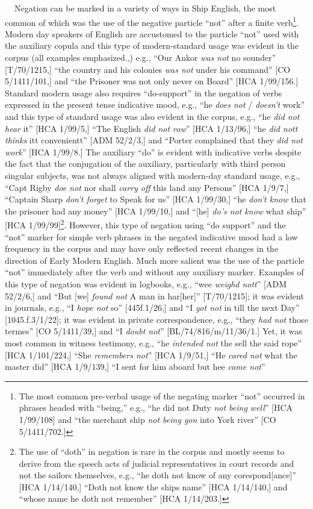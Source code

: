 \documentclass[12pt]{article}
\newenvironment{styleStandard}{\renewcommand\baselinestretch{1.0}\setlength\leftskip{0cm}\setlength\rightskip{0cm plus 1fil}\setlength\parindent{0cm}\setlength\parfillskip{0pt plus 1fil}\setlength\parskip{0in plus 1pt}\writerlistparindent\writerlistleftskip\leavevmode\normalfont\normalsize\writerlistlabel\ignorespaces}{\unskip\vspace{0in plus 1pt}\par}
\newcommand\writerlistleftskip{}
\newcommand\writerlistparindent{}
\newcommand\writerlistlabel{}
\begin{document}
\begin{styleStandard}
\textbf{\ \ }Negation can be marked in a variety of ways in Ship English, the most common of which was the use of the negative particle “not” after a finite verb\footnote{ The most common pre-verbal usage of the negating marker “not” occurred in phrases headed with “being,” e.g., “he did not Duty \textit{not being well}” [HCA 1/99/108] and “the merchant ship \textit{not being gon} into York river” [CO 5/1411/702.] }. Modern day speakers of English are accustomed to the particle “not” used with the auxiliary copula and this type of modern-standard usage was evident in the corpus (all examples emphasized.,) e.g., “Our Ankor \textit{was not} no sounder” [T/70/1215,] “the country and his colonies \textit{was not} under his command” [CO 5/1411/101,] and “the Prisoner was not only never on Board” [HCA 1/99/156.] Standard modern usage also requires “do-support” in the negation of verbs expressed in the present tense indicative mood, e.g., “he \textit{does not} / \textit{doesn’t }work” and this type of standard usage was also evident in the corpus, e.g., “he \textit{did not hear} it” [HCA 1/99/5,] “The English \textit{did not row}” [HCA 1/13/96,] “he \textit{did nott} \textit{thinks} itt convenientt” [ADM 52/2/3,] and “Porter complained that they \textit{did not work}” [HCA 1/99/8.] The auxiliary “do” is evident with indicative verbs despite the fact that the conjugation of the auxiliary, particularly with third person singular subjects, was not always aligned with modern-day standard usage, e.g., “Capt Rigby \textit{doe not} nor shall \textit{carry off} this land any Persons” [HCA 1/9/7,] “Captain Sharp \textit{don’t forget} to Speak for us” [HCA 1/99/30,] “he \textit{don’t know} that the prisoner had any money” [HCA 1/99/10,] and “[he] \textit{do’s not know} what ship” [HCA 1/99/99]\footnote{ The use of “doth” in negation is rare in the corpus and mostly seems to derive from the speech acts of judicial representatives in court records and not the sailors themselves, e.g., “he doth not know of any corespond[ance]” [HCA 1/14/140,] “Doth not know the ships name” [HCA 1/14/140,] and “whose name he doth not remember” [HCA 1/14/203.] }. However, this type of negation using “do support” and the “not” marker for simple verb phrases in the negated indicative mood had a low frequency in the corpus and may have only reflected recent changes in the direction of Early Modern English. Much more salient was the use of the particle “not” immediately after the verb and without any auxiliary marker. Examples of this type of negation was evident in logbooks, e.g., “wee \textit{weighd nott}” [ADM 52/2/6,] and “But [we] \textit{found not} A man in har[her]” [T/70/1215]; it was evident in journals, e.g., “I \textit{hope not} so” [445f.1/26,] and “I \textit{got not} in till the next Day” [1045.f.3/1/22]; it was evident in private correspondence, e.g., “they \textit{had not} those termes” [CO 5/1411/39,] and “I \textit{doubt not}” [BL/74/816/m/11/36/1.] Yet, it was most common in witness testimony, e.g., “he \textit{intended not} the sell the said rope” [HCA 1/101/224,] “She \textit{remembers not}” [HCA 1/9/51,] “He \textit{cared not} what the master did” [HCA 1/9/139,] “I sent for him aboard but hee \textit{came not}” 
\end{styleStandard}
\end{document}
